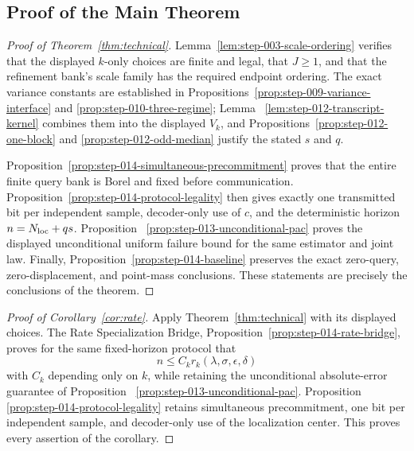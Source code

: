 \subsection{Proof of the Main Theorem}\label{app:main-proof}

\begin{proof}[Proof of Theorem~\ref{thm:technical}]
Lemma~\ref{lem:step-003-scale-ordering} verifies that the displayed
\(k\)-only choices are finite and legal, that \(J\geq1\), and that the
refinement bank's scale family has the required endpoint
ordering.  The exact variance constants are established in
Propositions~\ref{prop:step-009-variance-interface} and
\ref{prop:step-010-three-regime}; Lemma~
\ref{lem:step-012-transcript-kernel} combines them into the displayed
\(V_k\), and Propositions~\ref{prop:step-012-one-block} and
\ref{prop:step-012-odd-median} justify the stated \(s\) and \(q\).

Proposition~\ref{prop:step-014-simultaneous-precommitment} proves that the
entire finite query bank is Borel and fixed before communication.
Proposition~\ref{prop:step-014-protocol-legality} then gives exactly one
transmitted bit per independent sample, decoder-only use of \(c\), and the
deterministic horizon \(n=N_{\rm loc}+qs\).  Proposition~
\ref{prop:step-013-unconditional-pac} proves the displayed unconditional
uniform failure bound for the same estimator and joint law.  Finally,
Proposition~\ref{prop:step-014-baseline} preserves the exact zero-query,
zero-displacement, and point-mass conclusions.  These statements are
precisely the conclusions of the theorem.
\end{proof}

\begin{proof}[Proof of Corollary~\ref{cor:rate}]
Apply Theorem~\ref{thm:technical} with its displayed choices.  The Rate
Specialization Bridge, Proposition~\ref{prop:step-014-rate-bridge}, proves
for the same fixed-horizon protocol that
\[
n\leq C_kr_k(\lambda,\sigma,\epsilon,\delta)
\]
with \(C_k\) depending only on \(k\), while retaining the unconditional
absolute-error guarantee of Proposition~
\ref{prop:step-013-unconditional-pac}.  Proposition~
\ref{prop:step-014-protocol-legality} retains simultaneous precommitment,
one bit per independent sample, and decoder-only use of the localization
center.  This proves every assertion of the corollary.
\end{proof}
